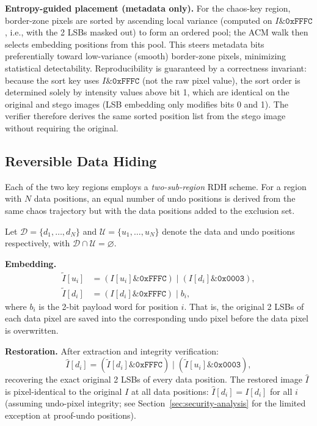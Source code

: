 \documentclass{jstarticle}
\begin{document}
\textbf{Entropy-guided placement (metadata only).}
For the chaos-key region, border-zone pixels are sorted by ascending local variance (computed on $I \mathbin{\&} \mathtt{0xFFFC}$, i.e., with the 2 LSBs masked out) to form an ordered pool; the ACM walk then selects embedding positions from this pool.
This steers metadata bits preferentially toward low-variance (smooth) border-zone pixels, minimizing statistical detectability.
Reproducibility is guaranteed by a correctness invariant: because the sort key uses $I \mathbin{\&} \mathtt{0xFFFC}$ (not the raw pixel value), the sort order is determined solely by intensity values above bit 1, which are identical on the original and stego images (LSB embedding only modifies bits 0 and 1).
The verifier therefore derives the same sorted position list from the stego image without requiring the original.

\subsection{Reversible Data Hiding}
\label{subsec:rdh}

Each of the two key regions employs a \emph{two-sub-region} RDH scheme.
For a region with $N$ data positions, an equal number of undo positions is derived from the same chaos trajectory but with the data positions added to the exclusion set.

Let $\mathcal{D} = \{d_1, \ldots, d_N\}$ and
$\mathcal{U} = \{u_1, \ldots, u_N\}$ denote the data and undo positions
respectively, with $\mathcal{D} \cap \mathcal{U} = \varnothing$.

\textbf{Embedding.}
\begin{align}
\tilde{I}[u_i] &= (I[u_i] \mathbin{\&} \mathtt{0xFFFC}) \mathbin{|} (I[d_i] \mathbin{\&} \mathtt{0x0003}), \label{eq:rdh-undo}\\
\tilde{I}[d_i] &= (I[d_i] \mathbin{\&} \mathtt{0xFFFC}) \mathbin{|} b_i, \label{eq:rdh-data}
\end{align}
where $b_i$ is the 2-bit payload word for position $i$.
That is, the original 2 LSBs of each data pixel are saved into the corresponding undo pixel before the data pixel is overwritten.

\textbf{Restoration.}
After extraction and integrity verification:
\begin{equation}
\hat{I}[d_i] = (\tilde{I}[d_i] \mathbin{\&} \mathtt{0xFFFC}) \mathbin{|}
               (\tilde{I}[u_i] \mathbin{\&} \mathtt{0x0003}),
\label{eq:rdh-restore}
\end{equation}
recovering the exact original 2 LSBs of every data position.
The restored image $\hat{I}$ is pixel-identical to the original $I$ at all data positions: $\hat{I}[d_i] = I[d_i]$ for all $i$ (assuming undo-pixel integrity; see Section~\ref{sec:security-analysis} for the limited exception at proof-undo positions).
\end{document}
